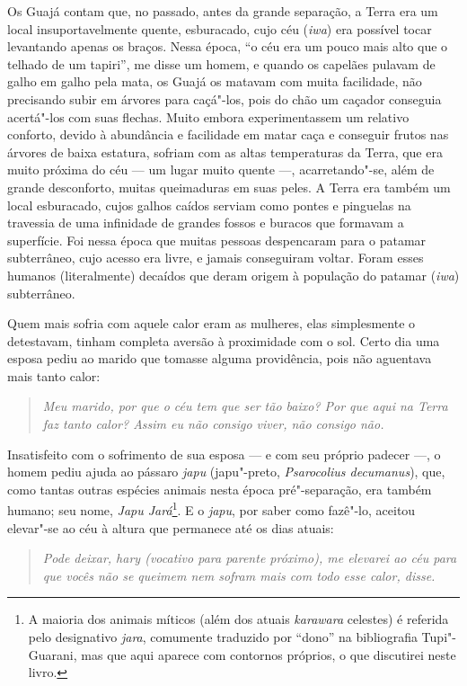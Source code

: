 Os Guajá contam que, no passado, antes da grande separação, a Terra era
um local insuportavelmente quente, esburacado, cujo céu (\emph{iwa}) era
possível tocar levantando apenas os braços. Nessa época, ``o céu era um
pouco mais alto que o telhado de um tapiri'', me disse um homem, e quando
os capelães pulavam de galho em galho pela mata, os Guajá os matavam com
muita facilidade, não precisando subir em árvores para caçá"-los, pois do
chão um caçador conseguia acertá"-los com suas flechas. Muito embora
experimentassem um relativo conforto, devido à abundância e facilidade
em matar caça e conseguir frutos nas árvores de baixa estatura, sofriam
com as altas temperaturas da Terra, que era muito próxima do céu --- um
lugar muito quente ---, acarretando"-se, além de grande desconforto, muitas
queimaduras em suas peles. A Terra era também um local esburacado, cujos
galhos caídos serviam como pontes e pinguelas na travessia de uma
infinidade de grandes fossos e buracos que formavam a superfície. Foi
nessa época que muitas pessoas despencaram para o patamar subterrâneo,
cujo acesso era livre, e jamais conseguiram voltar. Foram esses humanos
(literalmente) decaídos que deram origem à população do patamar
(\emph{iwa}) subterrâneo.

Quem mais sofria com aquele calor eram as mulheres, elas simplesmente o
detestavam, tinham completa aversão à proximidade com o sol. Certo dia
uma esposa pediu ao marido que tomasse alguma providência, pois não
aguentava mais tanto calor:

\begin{quote}
\emph{Meu marido, por que o céu tem que ser tão baixo? Por que aqui na Terra
faz tanto calor? Assim eu não consigo viver, não consigo não.}
\end{quote}

Insatisfeito com o sofrimento de sua esposa --- e com seu próprio padecer
---, o homem pediu ajuda ao pássaro \emph{japu} (japu"-preto,
\emph{Psarocolius decumanus}), que, como tantas outras espécies animais
nesta época pré"-separação, era também humano; seu nome, \emph{Japu
Jará}\footnote{A maioria dos animais míticos (além dos atuais
  \emph{karawara} celestes) é referida pelo designativo \emph{jara},
  comumente traduzido por ``dono'' na bibliografia Tupi"-Guarani, mas que
  aqui aparece com contornos próprios, o que discutirei neste livro.}. E
o \emph{japu}, por saber como fazê"-lo, aceitou elevar"-se ao céu à altura
que permanece até os dias atuais:

\begin{quote}
\emph{Pode deixar, \emph{hary} (vocativo para parente próximo), me elevarei
ao céu para que vocês não se queimem nem sofram mais com todo esse
calor, disse.}
\end{quote}

